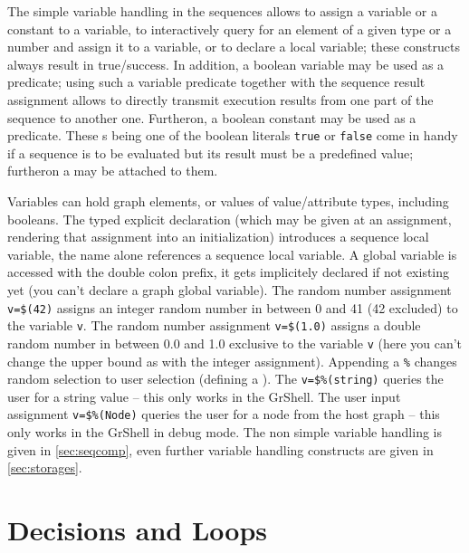 The simple variable handling in the sequences allows to assign a variable or a constant to a variable, to interactively query for an element of a given type or a number and assign it to a variable, or to declare a local variable; these constructs always result in true/success.
In addition, a boolean variable may be used as a predicate; using such a variable predicate together with the sequence result assignment allows to directly transmit execution results from one part of the sequence to another one.
Furtheron, a boolean constant may be used as a predicate. 
These s being one of the boolean literals \texttt{true} or \texttt{false} come in handy if a sequence is to be evaluated but its result must be a predefined value; furtheron a  may be attached to them.

Variables can hold graph elements, or values of value/attribute types, including booleans.
The typed explicit declaration (which may be given at an assignment, rendering that assignment into an initialization) introduces a sequence local variable, the name alone references a sequence local variable.
A global variable is accessed with the double colon prefix, it gets implicitely declared if not existing yet (you can't declare a graph global variable).
The random number assignment \texttt{v=\$(42)} assigns an integer random number in between 0 and 41 (42 excluded) to the variable \texttt{v}. 
The random number assignment \texttt{v=\$(1.0)} assigns a double random number in between 0.0 and 1.0 exclusive to the variable \texttt{v} (here you can't change the upper bound as with the integer assignment). 
Appending a \texttt{\%} changes random selection to user selection (defining a ).
The  \texttt{v=\$\%(string)} queries the user for a string value -- this only works in the GrShell.
The user input assignment \texttt{v=\$\%(Node)} queries the user for a node from the host graph -- this only works in the GrShell in debug mode.
The non simple variable handling is given in \ref{sec:seqcomp}, even further variable handling constructs are given in \ref{sec:storages}.


\section{Decisions and Loops}

